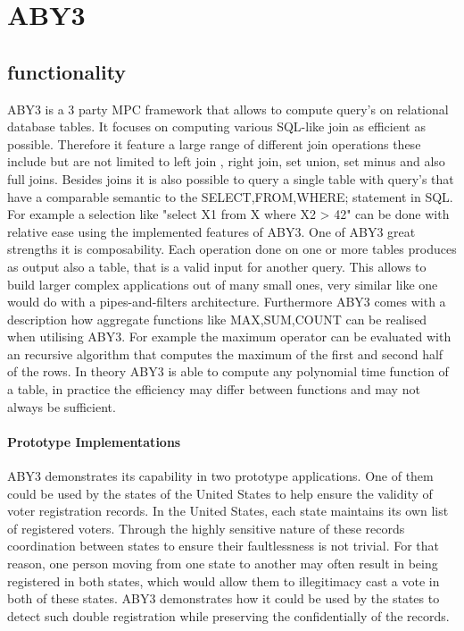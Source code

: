 \section{ABY3}

\subsection{functionality }
ABY3 is a 3 party MPC framework that allows to compute query's on relational database tables. It focuses on computing various SQL-like join as efficient as possible. Therefore it feature a large range of different join operations these include but are not limited to  left join , right join, set union, set minus and also full joins.  
Besides joins it is also possible to query a single table with query's that have a comparable semantic to the SELECT,FROM,WHERE; statement in SQL. For example a selection like "select X1 from X  where X2 > 42" can be done with relative ease using the implemented features of ABY3. One of ABY3 great strengths it is composability.
Each operation done on one or more tables produces as output also a table, that is a valid input for another query. This allows to build larger complex applications out of many small ones, very similar like one would do with a pipes-and-filters architecture. 
Furthermore ABY3 comes with a description how aggregate functions like MAX,SUM,COUNT can be realised when utilising ABY3. For example the maximum operator can be evaluated with an recursive algorithm that computes the maximum of the first and second half of the rows. In theory ABY3 is able to compute any polynomial time function of a table, in practice the efficiency may differ between functions and may not always be sufficient.   


\paragraph{Prototype Implementations}
ABY3 demonstrates its capability in two prototype applications. One of them could be used by the states of the United States to help ensure the validity of voter registration records. In the United States, each state maintains its own list of registered voters. Through the highly sensitive nature of these records coordination between states to ensure their faultlessness is not trivial. For that reason, one person moving from one state to another may often result in being registered in both states, which would allow them to illegitimacy cast a vote in both of these states.
ABY3 demonstrates how it could be used by the states to detect such double registration while preserving the confidentially of the records. 



